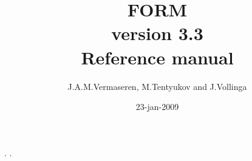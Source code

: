 \documentclass[11pt]{report}
\newcommand{\emptypage}{\newpage \thispagestyle{empty} \tiny{.} \normalsize}
\newcommand{\clearemptydoublepage}{\newpage{\pagestyle{empty}\cleardoublepage}}
\begin{document}
\begin{titlepage}
\title{\Huge FORM \\ \Large version 3.3 \\ \huge Reference manual}
\date{23-jan-2009}
\author{J.A.M.Vermaseren, M.Tentyukov and J.Vollinga}
\end{titlepage}
\maketitle

\setcounter{page}{2}
\clearemptydoublepage
\emptypage
\clearemptydoublepage
{}
\setcounter{page}{1}
\clearemptydoublepage
\tableofcontents
\clearemptydoublepage
\emptypage
\clearemptydoublepage
{}
\setcounter{page}{1}


















\printindex
\end{document}
